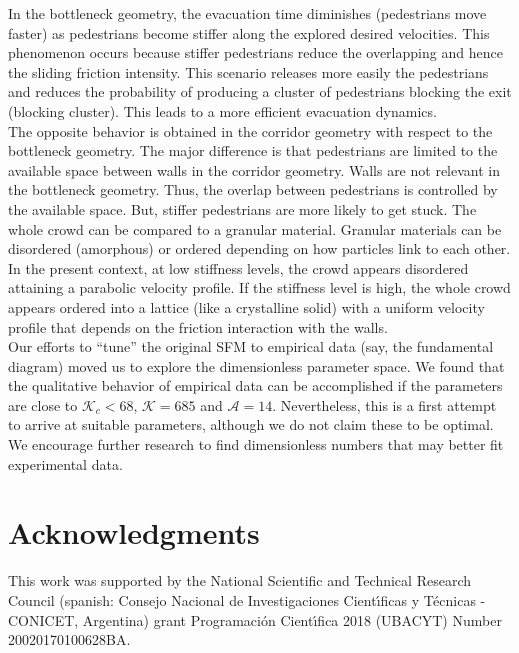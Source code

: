 \documentclass[preprint,12pt]{elsarticle}
\begin{document}
In the bottleneck geometry, the evacuation time diminishes (pedestrians move faster) as pedestrians become stiffer along the explored desired velocities. This phenomenon occurs because stiffer pedestrians reduce the overlapping and hence the sliding friction intensity. This scenario releases more easily the pedestrians and reduces the probability of producing a cluster of pedestrians blocking the exit (blocking cluster). This leads to a more efficient evacuation dynamics. \\

The opposite behavior is obtained in the corridor geometry with respect to the bottleneck geometry. The major difference is that pedestrians are limited to the available space between walls in the corridor geometry.  Walls are not relevant in the bottleneck geometry. Thus, the overlap between pedestrians is controlled by the available space. But, stiffer pedestrians are more likely to get stuck. The whole crowd can be compared to a granular material. Granular materials can be disordered (amorphous) or ordered depending on how particles link to each other. In the present context, at low stiffness levels, the crowd appears disordered attaining a parabolic velocity profile.
If the stiffness level is high, the whole crowd appears ordered into a lattice (like a crystalline solid) with a uniform velocity profile that depends on the friction interaction with the walls.\\

Our efforts to ``tune'' the original SFM to empirical data (say, the fundamental diagram) moved us to explore the dimensionless parameter space.  We found that the qualitative behavior of empirical  data can be accomplished if the parameters are close to $\mathcal{K}_c < 68$, $\mathcal{K} = 685$ and $\mathcal{A}=14$. Nevertheless, this is a first attempt to arrive at suitable parameters, although we do not claim these to be optimal. We encourage further research to find dimensionless numbers that may better fit experimental data.\\


\section*{Acknowledgments}
This work was supported by the National Scientific and Technical 
Research Council (spanish: Consejo Nacional de Investigaciones Cient\'\i ficas 
y T\'ecnicas - CONICET, Argentina) grant Programaci\'on Cient\'\i fica 2018 (UBACYT) Number 20020170100628BA.\\
\end{document}

